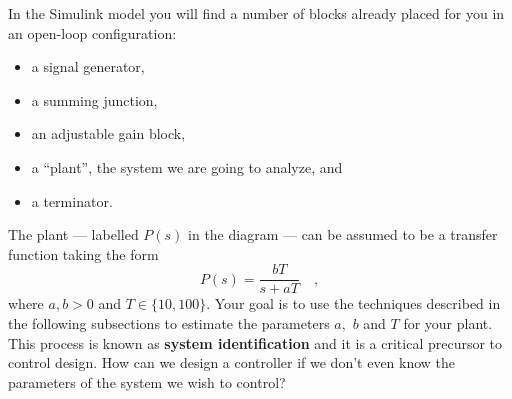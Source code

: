 In the Simulink model you will
find a number of blocks already placed for you in an 
open-loop configuration:
\begin{itemize}
  \item{a signal generator,}
  \item{a summing junction,}
  \item{an adjustable gain block,}
  \item{a ``plant'', the system we are going to analyze, and}
  \item{a terminator.}
\end{itemize}
%
The plant --- labelled \(P(s)\) in the diagram --- can be assumed to be a
transfer function taking the form
\[
  P(s) = \frac{b T}{s + a T} \quad ,
\]
where \(a, b > 0\) and \(T \in \{10, 100\}.\) Your goal is to use the
techniques described in the following subsections to estimate the parameters
\(a,\) \(b\) and \(T\) for your plant. This process is known as
\textbf{system identification} and it is a critical precursor to control
design. How can we design a controller if we don't even know the parameters
of the system we wish to control?


